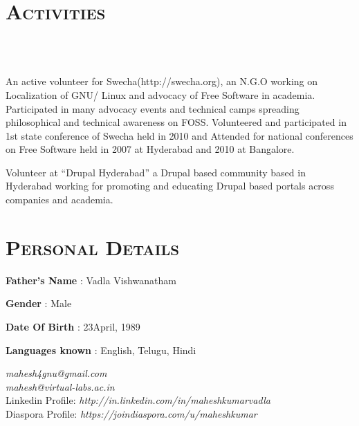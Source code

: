 \begin{resume}

\section{\textsc{Activities}}

\begin{formatb}
  \\
  \body\\
\end{formatb}

\begin{position}
An active volunteer for Swecha(http://swecha.org), an N.G.O working on
Localization of GNU/ Linux and advocacy of Free Software in
academia. Participated in many advocacy events and technical camps
spreading philosophical and technical awareness on FOSS. Volunteered
and participated in 1st state conference of Swecha held in 2010 and
Attended for national conferences on Free Software held in 2007 at
Hyderabad and 2010 at Bangalore.

\end{position}

\begin{position}
Volunteer at ``Drupal Hyderabad'' a Drupal based community based in
Hyderabad working for promoting and educating Drupal based portals
across companies and academia.\\ 
\end{position}


\section{\textsc{Personal Details}}


\textbf{Father's Name} : Vadla Vishwanatham

\textbf{Gender} : Male

\textbf{Date Of Birth} : 23\third April, 1989

\textbf{Languages known} : English, Telugu, Hindi

\dates{}
\begin{position}
\emph{mahesh4gnu@gmail.com}\\
\emph{mahesh@virtual-labs.ac.in}\\
Linkedin Profile:\emph{ http://in.linkedin.com/in/maheshkumarvadla}\\
Diaspora Profile:\emph{ https://joindiaspora.com/u/maheshkumar}
\end{position}


\end{resume}
